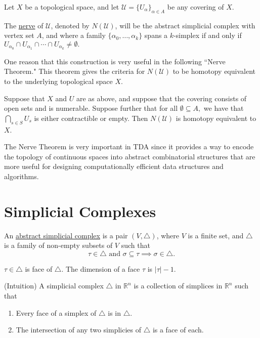 \begin{defn}[Nerve]
	Let $X$ be a topological space, and let $\mathcal{U} = \{U_\alpha\}_{\alpha\in A}$ be any covering of $X$. 
	
	The \underline{nerve} of $\mathcal{U}$, denoted by $N(\mathcal{U})$, will be the abstract simplicial complex with vertex set $A$, and where a family $\{\alpha_0, \dots, \alpha_k\}$ spans a $k$-simplex if and only if $U_{\alpha_0}\cap U_{\alpha_1} \cap \cdots \cap U_{\alpha_k} \neq \emptyset.$
\end{defn}

One reason that this construction is very useful in the following ``Nerve Theorem." This theorem gives the criteria for $N(\mathcal{U})$ to be homotopy equivalent to the underlying topological space $X$.

\begin{thm}
Suppose that $X$ and $U$ are as above, and suppose that the covering consists of open sets and is numerable. Suppose further that for all $\emptyset \subseteq A,$ we have that $\bigcap_{s\in S} U_s$ is either contractible or empty. Then $N(\mathcal{U})$ is homotopy equivalent to $X$.
\end{thm}
The Nerve Theorem is very important in TDA since it provides a way to encode the topology of continuous spaces into abstract combinatorial structures that are more useful for designing computationally efficient data structures and algorithms.

\section{Simplicial Complexes}

\begin{defn}

	An \underline{abstract simplicial complex} is a pair $(V, \triangle)$, where $V$ is a finite set, and $\triangle$ is a family of non-empty subsets of $V$ such that 
	$$\tau \in \triangle \text{ and }\sigma \subseteq \tau \implies \sigma \in \triangle.$$
	
	$\tau \in \triangle $ is face of $\triangle$. The dimension of a face $\tau$ is $|\tau| - 1.$
	
	(Intuition) A simplicial complex $\triangle$ in $\mathbb{R}^n$ is a collection of simplices in $\mathbb{R}^n$ such that
	\begin{enumerate}
	    \item Every face of a simplex of $\triangle$ is in $\triangle$.
	    \item The intersection of any two simplicies of $\triangle$ is a face of each. 
	\end{enumerate}
\end{defn}

